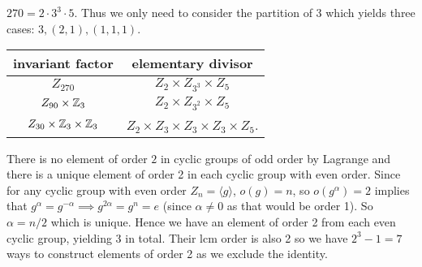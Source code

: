 \documentclass[12pt]{article}
\begin{document}
\begin{problem}[2]
$ 270 = 2 \cdot 3^3 \cdot 5$. Thus we only need to consider the partition of 3 which yields three cases: $ 3,(2,1),(1,1,1)$.
\begin{table}[H]
	\centering
	\begin{tabular}{c|c}
	\hline
	invariant factor & elementary divisor\\
	\hline
	$ Z_{270}$ & $Z_2 \times  Z_{3^3} \times Z_5$ \\
	$ Z_{90} \times \mathbb{Z}_3$ & $ Z_2 \times Z_{3^2} \times Z_5$ \\
	$ Z_{30} \times \mathbb{Z}_3 \times \mathbb{Z}_3$ & $ Z_2 \times Z_3 \times Z_3 \times Z_3 \times Z_5$. 
	\end{tabular}
\end{table}
\end{problem}
\begin{problem}[3]
There is no element of order $ 2$ in cyclic groups of odd order by Lagrange and there is a unique element of order 2 in each cyclic group with even order. Since for any cyclic group with even order $ Z_n = \langle g \rangle$, $ o(g) = n$, so $ o(g^{ \alpha}) = 2$ implies that $ g^{ \alpha} = g^{ - \alpha} \implies g^{ 2\alpha} = g^{n} =e$ (since $ \alpha \neq 0$ as that would be order 1). So $ \alpha = n /2$ which is unique. Hence we have an element of order 2 from each even cyclic group, yielding 3 in total. Their lcm order is also 2 so we have $ 2^3 -1 = 7$ ways to construct elements of order 2 as we exclude the identity.
\end{problem}
\end{document}
